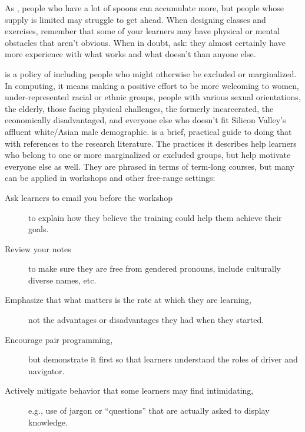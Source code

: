 As ,
people who have a lot of spoons can accumulate more,
but people whose supply is limited may struggle to get ahead.
When designing classes and exercises,
remember that some of your learners may have physical or mental obstacles that aren't obvious.
When in doubt, ask:
they almost certainly have more experience with what works and what doesn't than anyone else.


 is a policy of including people who might otherwise be excluded or marginalized.
In computing,
it means making a positive effort to be more welcoming to women,
under-represented racial or ethnic groups,
people with various sexual orientations,
the elderly,
those facing physical challenges,
the formerly incarcerated,
the economically disadvantaged,
and everyone else who doesn't fit Silicon Valley's affluent white/Asian male demographic.
\cite{Lee2017} is a brief, practical guide to doing that with references to the research literature.
The practices it describes help learners who belong to one or more marginalized or excluded groups,
but help motivate everyone else as well.
They are phrased in terms of term-long courses,
but many can be applied in workshops and other free-range settings:

\begin{description}

\item[Ask learners to email you before the workshop]
  to explain how they believe the training could help them achieve their goals.

\item[Review your notes]
  to make sure they are free from gendered pronouns, include culturally diverse names, etc.

\item[Emphasize that what matters is the rate at which they are learning,]
  not the advantages or disadvantages they had when they started.

\item[Encourage pair programming,]
  but demonstrate it first so that learners understand the roles of driver and navigator.

\item[Actively mitigate behavior that some learners may find intimidating,]
  e.g., use of jargon or ``questions'' that are actually asked to display knowledge.

\end{description}

